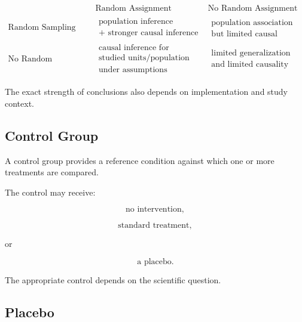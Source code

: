 \[
\begin{array}{c|c|c}
&
\text{Random Assignment}
&
\text{No Random Assignment}
\\
\hline
\text{Random Sampling}
&
\begin{array}{c}
\text{population inference}\\
+\text{ stronger causal inference}
\end{array}
&
\begin{array}{c}
\text{population association}\\
\text{but limited causal claim}
\end{array}
\\[4mm]
\text{No Random Sampling}
&
\begin{array}{c}
\text{causal inference for}\\
\text{studied units/population}\\
\text{under assumptions}
\end{array}
&
\begin{array}{c}
\text{limited generalization}\\
\text{and limited causality}
\end{array}
\end{array}
\]

The exact strength of conclusions also depends on implementation and
study context.

\subsection{Control Group}
\label{subsec:control-group}

A control group provides a reference condition against which one or more
treatments are compared.

The control may receive:

\[
\text{no intervention},
\]

\[
\text{standard treatment},
\]

or

\[
\text{a placebo}.
\]

The appropriate control depends on the scientific question.

\subsection{Placebo}
\label{subsec:placebo}

